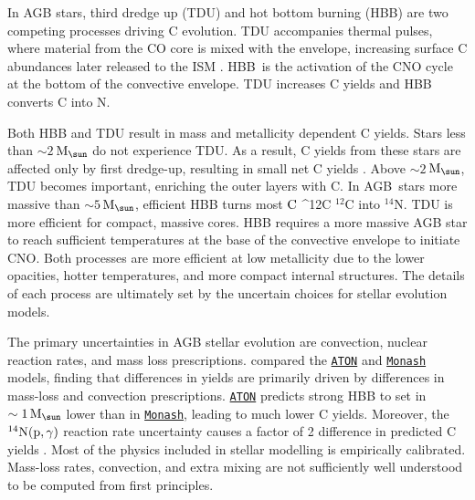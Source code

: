 \documentclass[fleqn,
usenatbib]{mnras}
\makeatletter
\newcommand{\monash}{\texttt{\hyperlink{monash}{Monash}}}
\newcommand{\aton}{\texttt{\hyperlink{aton}{ATON}}}
\newcommand{\agb}{AGB}
\newcommand{\C}[1][\@nil]{
    \def\tmp{#1}%
    \ifx\tmp\@nnil%
        \ensuremath{\rm C}%
    \else%
        \ifmmode ^{#1}{\rm C}%
        \else $^{#1}$C%
        \fi%
\fi }
\newcommand{\Mo}{ {\rm M}_{\sun}}
\newcommand{\about}[1]{${\sim} #1$}
\makeatother
\begin{document}
In AGB stars, {third dredge up} (TDU) and {hot bottom burning} (HBB) are two competing processes driving C evolution.
TDU accompanies thermal pulses, where material from the CO core is mixed with the envelope, increasing surface C abundances 
later released to the ISM \citep{KL14}.  
HBB\ is the activation of the CNO cycle at the bottom of the convective envelope.
TDU increases C yields and HBB converts C into N. 



Both HBB and TDU result in mass and metallicity dependent C yields. 
Stars less than \about{2}\,$\Mo$ do not experience TDU. As a result, C yields from these stars are affected only by first dredge-up, resulting in small net C yields \citep[Table 1]{karakas10}.
Above \about{2}\,$\Mo$, TDU becomes important, enriching the outer layers with C.
In \agb\ stars more massive than \about{5}\,$\Mo$, efficient HBB turns most \C[12] into $^{14}$N.
TDU is more efficient for compact, massive cores. HBB requires a more massive AGB star to reach sufficient temperatures at the base of the convective envelope to initiate CNO. Both processes are more efficient at low metallicity due to the lower opacities, hotter temperatures, and more compact internal structures. The details of each process are ultimately set by the uncertain choices for stellar evolution models.



The primary uncertainties in AGB stellar evolution are convection, nuclear reaction rates, and mass loss prescriptions.
\citet{ventura+15} compared the \aton{} and \monash{} models, finding that differences in yields are primarily driven by differences in mass-loss and convection prescriptions. \aton{} predicts strong HBB to set in $\sim{1}\,\Mo$ lower than in \monash{}, leading to much lower C yields.
Moreover, the $^{14}{\rm N}({\rm p},\gamma)$ reaction rate uncertainty causes a factor of 2 difference in predicted C yields \citep{herwig+austin2004, HAL2006}.
Most of the physics included in stellar modelling is empirically calibrated. Mass-loss rates, convection, and extra mixing are not sufficiently well understood to be computed from first principles.
\end{document}
